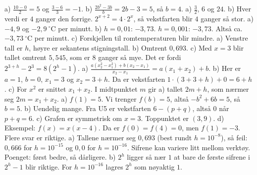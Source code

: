  a) $\frac{10 - 0}{2} = 5$ og $\frac{3 - 6}{3} = -1$.
b) $\frac{2b^2 - 3b}{b} = 2b - 3 = 5$, så $b = 4$.
 a) $\frac{3}{2}$, $6$ og $24$. b) Hver verdi er $4$ ganger den forrige. $2^{x+2} = 4 \cdot 2^x$, så vekstfarten blir $4$ ganger så stor.
 a) $-4,9$ og $-2,9\ {}^\circ$C per minutt.
b) $h = 0,01$: $-3,73$. $h = 0,001$: $-3,73$. Altså ca. $-3,73\ {}^\circ$C per minutt.
c) Forskjellen til romtemperaturen blir mindre.
 a) Venstre tall er $h$, høyre er sekantens stigningstall. b) Omtrent $0,693$.
c) Med $x = 3$ blir tallet omtrent $5,545$, som er $8$ ganger så mye. Det er fordi $2^{3+h} - 2^3 = 8(2^h - 1)$.
 a) $\frac{a(x_2^2 - x_1^2) + b(x_2 - x_1)}{x_2 - x_1} = a(x_1 + x_2) + b$.
b) Her er $a = 1$, $b = 0$, $x_1 = 3$ og $x_2 = 3 + h$. Da er vekstfarten $1 \cdot (3 + 3 + h) + 0 = 6 + h$.
c) For $x^2$ er snittet $x_1 + x_2$. I midtpunktet $m$ gir a) tallet $2m + h$, som nærmer seg $2m = x_1 + x_2$.
 a) $f(1) = 5$. Vi trenger $f(b) = 5$, altså $-b^2 + 6b = 5$, så $b = 5$.
b) Uendelig mange. Fra U5 er vekstfarten $6 - (p + q)$, altså $0$ når $p + q = 6$.
c) Grafen er symmetrisk om $x = 3$. Toppunktet er $(3, 9)$.
d) Eksempel: $f(x) = x(x - 4)$. Da er $f(0) = f(4) = 0$, men $f(1) = -3$. Flere svar er riktige.
 a) Tallene nærmer seg $0,693$ (best rundt $h = 10^{-8}$), så feil: $0,666$ for $h = 10^{-15}$ og $0,0$ for $h = 10^{-16}$.
Sifrene kan variere litt mellom verktøy. Poenget: først bedre, så dårligere.
b) $2^h$ ligger så nær $1$ at bare de første sifrene i $2^h - 1$ blir riktige. For $h = 10^{-16}$ lagres $2^h$ som nøyaktig $1$.
